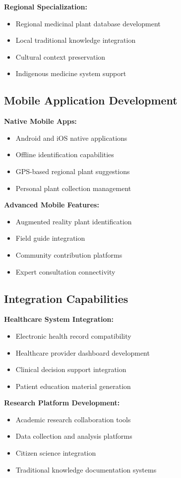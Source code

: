 \documentclass[conference]{IEEEtran}
\begin{document}
\textbf{Regional Specialization:}
\begin{itemize}
\item Regional medicinal plant database development
\item Local traditional knowledge integration
\item Cultural context preservation
\item Indigenous medicine system support
\end{itemize}

\subsection{Mobile Application Development}

\textbf{Native Mobile Apps:}
\begin{itemize}
\item Android and iOS native applications
\item Offline identification capabilities
\item GPS-based regional plant suggestions
\item Personal plant collection management
\end{itemize}

\textbf{Advanced Mobile Features:}
\begin{itemize}
\item Augmented reality plant identification
\item Field guide integration
\item Community contribution platforms
\item Expert consultation connectivity
\end{itemize}

\subsection{Integration Capabilities}

\textbf{Healthcare System Integration:}
\begin{itemize}
\item Electronic health record compatibility
\item Healthcare provider dashboard development
\item Clinical decision support integration
\item Patient education material generation
\end{itemize}

\textbf{Research Platform Development:}
\begin{itemize}
\item Academic research collaboration tools
\item Data collection and analysis platforms
\item Citizen science integration
\item Traditional knowledge documentation systems
\end{itemize}
\end{document}
